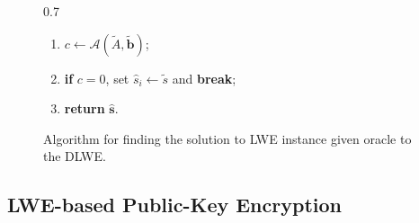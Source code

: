 \documentclass{template}
\begin{document}
\begin{figure}[ht]
\begin{varwidth}{0.7\linewidth}
\begin{mdframed}[linecolor=black,
                 linewidth=1.0pt,
                 skipabove=10pt,
                 skipbelow=10pt,
                 leftmargin=0pt,
                 rightmargin=0pt]
\begin{enumerate}
    \item \hspace{20px} $c \gets \mathcal{A}(\widetilde{A}, \widetilde{\mathbf{b}})$;
    \item \hspace{20px} \textbf{if} $c=0$, set $\widehat{s}_i \gets \widetilde{s}$ and \textbf{break};
    \item \textbf{return} $\widehat{\mathbf{s}}$.
\end{enumerate}
\end{mdframed}
\end{varwidth}
\caption{Algorithm for finding the solution to LWE instance given oracle to the DLWE.}
\label{fig:dlwe-to-slwe}
\end{figure}

\subsection{LWE-based Public-Key Encryption}
\end{document}
